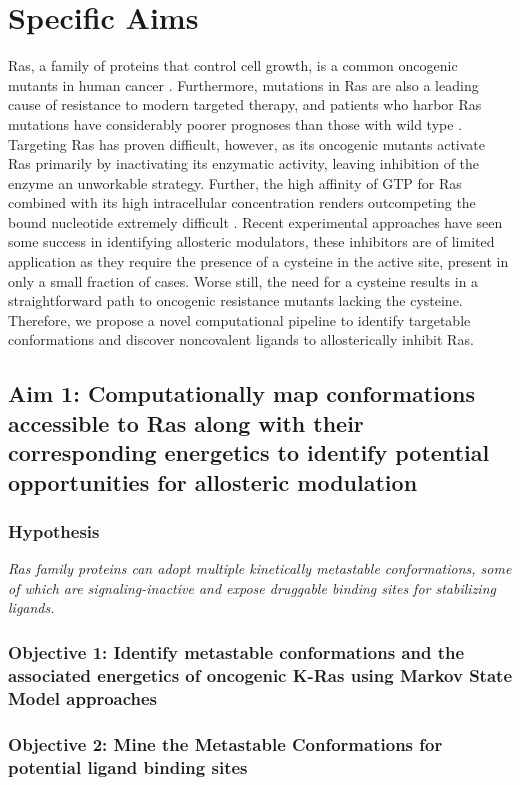\documentclass[12pt]{article}
\date{}
\begin{document}
\renewcommand{\familydefault}{\sfdefault}
\section*{Specific Aims}
Ras, a family of proteins that control cell growth, is a common oncogenic mutants in human cancer \cite{pyla}. Furthermore, mutations in Ras are also a leading cause of resistance to modern targeted therapy, and patients who harbor Ras mutations have considerably poorer prognoses than those with wild type \cite{mak2014}. Targeting Ras has proven difficult, however, as its oncogenic mutants activate Ras primarily by inactivating its enzymatic activity, leaving inhibition of the enzyme an unworkable strategy. Further, the high affinity of GTP for Ras combined with its high intracellular concentration renders outcompeting the bound nucleotide extremely difficult \cite{ostrem2013}. Recent experimental approaches have seen some success in identifying allosteric modulators, these inhibitors are of limited application as they require the presence of a cysteine in the active site, present in only a small fraction of cases. Worse still, the need for a cysteine results in a straightforward path to oncogenic resistance mutants lacking the cysteine. Therefore, we propose a novel computational pipeline to identify targetable conformations and discover noncovalent ligands to allosterically inhibit Ras.
\subsection*{Aim 1: Computationally map conformations accessible to Ras along with their corresponding energetics to identify potential opportunities for allosteric modulation}
 \subsubsection*{Hypothesis}
  \textit{Ras family proteins can adopt multiple kinetically metastable conformations, some of which are signaling-inactive and expose druggable binding sites for stabilizing ligands.}
  \subsubsection*{Objective 1: Identify metastable conformations and the associated energetics of oncogenic K-Ras using Markov State Model approaches}
  \subsubsection*{Objective 2: Mine the Metastable Conformations for potential ligand binding sites}
\end{document}
